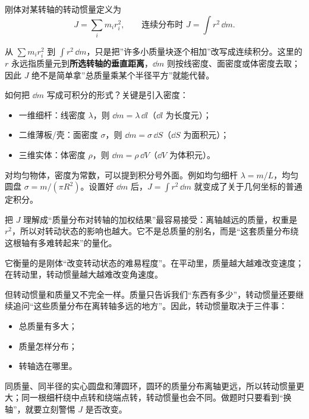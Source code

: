 \documentclass[lang=cn,11pt]{elegantbook}
\newcommand{\bridge}[1]{\begin{note}#1\end{note}}
\begin{document}
\begin{definition}[转动惯量]\label{def:moment-of-inertia}
刚体对某转轴的转动惯量定义为
\[
J=\sum_i m_i r_i^2,\qquad
\text{连续分布时 }J=\int r^2\,\dd m.
\]
\end{definition}

\bridge{从 \(\sum m_i r_i^2\) 到 \(\int r^2\,\dd m\)，只是把”许多小质量块逐个相加”改写成连续积分。这里的 \(r\) 永远指质量元到\textbf{所选转轴的垂直距离}，\(\dd m\) 则按线密度、面密度或体密度去取；因此 \(J\) 绝不是简单拿”总质量乘某个半径平方”就能代替。}

\begin{remark}
如何把 \(\dd m\) 写成可积分的形式？关键是引入密度：
\begin{itemize}
\item 一维细杆：线密度 \(\lambda\)，则 \(\dd m=\lambda\,\dd l\)（\(\dd l\) 为长度元）；
\item 二维薄板/壳：面密度 \(\sigma\)，则 \(\dd m=\sigma\,\dd S\)（\(\dd S\) 为面积元）；
\item 三维实体：体密度 \(\rho\)，则 \(\dd m=\rho\,\dd V\)（\(\dd V\) 为体积元）。
\end{itemize}
对均匀物体，密度为常数，可以提到积分号外面。例如均匀细杆 \(\lambda=m/L\)，均匀圆盘 \(\sigma=m/(\pi R^2)\)。设置好 \(\dd m\) 后，\(J=\int r^2\,\dd m\) 就变成了关于几何坐标的普通定积分。
\end{remark}

把 \(J\) 理解成“质量分布对转轴的加权结果”最容易接受：离轴越远的质量，权重是 \(r^2\)，所以对转动状态的影响也越大。它不是总质量的别名，而是“这套质量分布绕这根轴有多难转起来”的量化。

它衡量的是刚体“改变转动状态的难易程度”。在平动里，质量越大越难改变速度；在转动里，转动惯量越大越难改变角速度。

但转动惯量和质量又不完全一样。质量只告诉我们“东西有多少”，转动惯量还要继续追问“这些质量分布在离转轴多远的地方”。因此，转动惯量取决于三件事：
\begin{itemize}
  \item 总质量有多大；
  \item 质量怎样分布；
  \item 转轴选在哪里。
\end{itemize}

\begin{note}
同质量、同半径的实心圆盘和薄圆环，圆环的质量分布离轴更远，所以转动惯量更大；同一根细杆绕中点转和绕端点转，转动惯量也会不同。做题时只要看到“换轴”，就要立刻警惕 \(J\) 是否改变。
\end{note}
\end{document}
